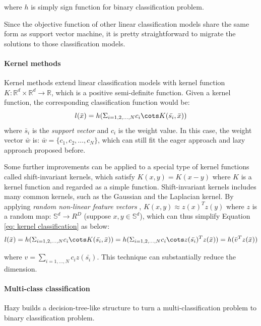 where $h$ is simply sign function for binary classification problem.

Since the objective function of other linear classification models share the same form as support vector machine, it is pretty straightforward to migrate the solutions to those classification models.

\paragraph{Kernel methods}
Kernel methods extend linear classification models with kernel function $K: \mathbb{R}^d \times \mathbb{R}^d \rightarrow \mathbb{R}$, which is a positive semi-definite function. Given a kernel function, the corresponding classification function would be:
\begin{equation}\label{eq: kernel classification}
    l(\bar{x})=h(\Sigma_{i=1,2,\dots,N}c_i\cots K(\bar{s_i}, \bar{x}))
\end{equation}
where $\bar{s}_i$ is the {\em support vector} and $c_i$ is the weight value. In this case, the weight vector $\bar{w}$ is: $\bar{w} = \{c_1, c_2,\dots, c_N\}$, which can still fit the eager approach and lazy approach proposed before.

Some further improvements can be applied to a special type of kernel functions called shift-invariant kernels, which satisfy $K(x, y) = K(x-y)$ where $K$ is a kernel function and regarded as a simple function. Shift-invariant kernels includes many common kernels, such as the Gaussian and the Laplacian kernel. By applying {\em random non-linear feature vectors} \cite{rahimi2008random}, $K(x, y) \approx z(x)^Tz(y)$ where $z$ is a random map: $\mathbb{S}^d \rightarrow R^D$ (suppose $x, y \in \mathbb{S}^d$), which can thus simplify Equation \ref{eq: kernel classification} as below:
\begin{equation}
    l(\bar{x})=h(\Sigma_{i=1,2,\dots,N}c_i\cots K(\bar{s_i}, \bar{x})) = h(\Sigma_{i=1,2,\dots,N}c_i\cots z(\bar{s_i})^Tz(\bar{x}))=h(\bar{v}^Tz(\bar{x}))
\end{equation}

where $v=\sum_{i=1,\dots,N}c_iz(\bar{s_i})$. This technique can substantially reduce the dimension.

\paragraph{Multi-class classification}
Hazy builds a decision-tree-like structure to turn a multi-classification problem to binary classification problem.


